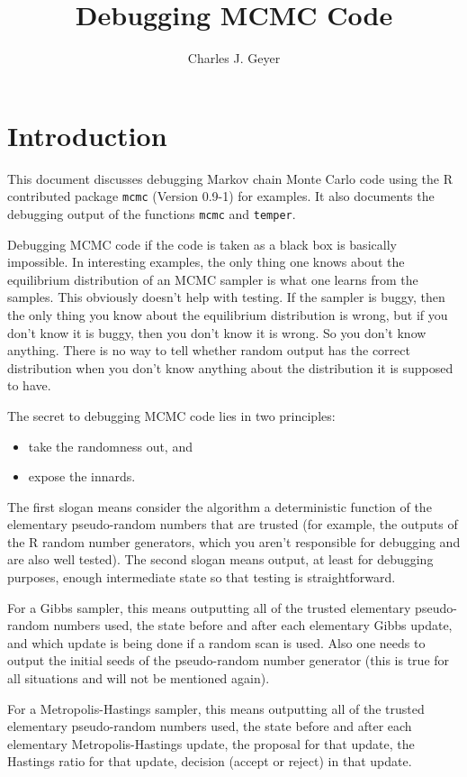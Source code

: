 \documentclass{article}
\begin{document}
\title{Debugging MCMC Code}
\author{Charles J. Geyer}
\maketitle

\section{Introduction}

This document discusses debugging Markov chain Monte Carlo code
using the R contributed package \texttt{mcmc} (Version 0.9-1)
for examples.  It also documents the debugging output of the functions
\texttt{mcmc} and \texttt{temper}.

Debugging MCMC code if the code is taken as a black box is basically
impossible.  In interesting examples, the only thing one knows about
the equilibrium distribution of an MCMC sampler is what one learns
from the samples.  This obviously doesn't help with testing.  If the
sampler is buggy, then the only thing you know about the equilibrium
distribution is wrong, but if you don't know it is buggy, then you don't
know it is wrong.  So you don't know anything.  There is no way to tell
whether random output has the correct distribution when you don't know
anything about the distribution it is supposed to have.

The secret to debugging MCMC code lies in two principles:
\begin{itemize}
\item take the randomness out, and
\item expose the innards.
\end{itemize}
The first slogan means consider the algorithm a deterministic function
of the elementary pseudo-random numbers that are trusted (for example,
the outputs of the R random number generators, which you aren't responsible
for debugging and are also well tested).
The second slogan means output, at least for debugging purposes, enough
intermediate state so that testing is straightforward.

For a Gibbs sampler, this means outputting all of the trusted elementary
pseudo-random numbers used, the state before and after each elementary
Gibbs update, and which update is being done if a random scan is used.
Also one needs to output the initial seeds of the pseudo-random number
generator (this is true for all situations and will not be mentioned again).

For a Metropolis-Hastings sampler, this means outputting all of the trusted
elementary
pseudo-random numbers used, the state before and after each elementary
Metropolis-Hastings update, the proposal for that update, the Hastings ratio
for that update, decision (accept or reject) in that update.
\end{document}
